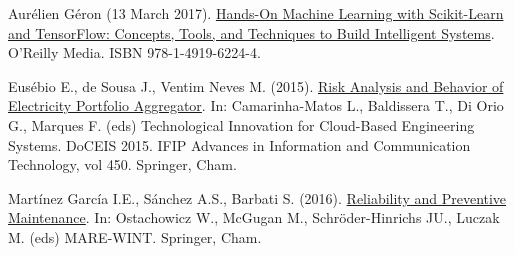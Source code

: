 \documentclass[LaM,binding=0.6cm, english]{sapthesis}
\begin{document}
\cleardoublepage
{} %
\begin{thebibliography}{9}

Aurélien Géron (13 March 2017). \href{https://books.google.com/books?id=bRpYDgAAQBAJ}{Hands-On Machine Learning with Scikit-Learn and TensorFlow: Concepts, Tools, and Techniques to Build Intelligent Systems}. O'Reilly Media. ISBN 978-1-4919-6224-4.

Eusébio E., de Sousa J., Ventim Neves M. (2015). \href{https://doi.org/10.1007/978-3-319-16766-4_39}{Risk Analysis and Behavior of Electricity Portfolio Aggregator}. In: Camarinha-Matos L., Baldissera T., Di Orio G., Marques F. (eds) Technological Innovation for Cloud-Based Engineering Systems. DoCEIS 2015. IFIP Advances in Information and Communication Technology, vol 450. Springer, Cham.

Martínez García I.E., Sánchez A.S., Barbati S. (2016). \href{https://doi.org/10.1007/978-3-319-39095-6_15}{Reliability and Preventive Maintenance}. In: Ostachowicz W., McGugan M., Schröder-Hinrichs JU., Luczak M. (eds) MARE-WINT. Springer, Cham.

\end{thebibliography}
\end{document}
